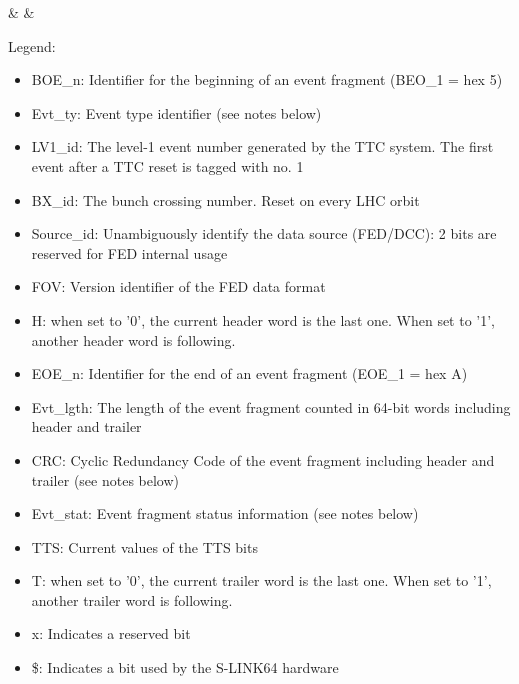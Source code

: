 \begin{landscape}
\begin{table}[htb]
  \caption{Example of a table for a 64-bit format}\label{tab:test3}
    \begin{bittabular}{64}
      & \bitNumEightByte
      & \bitNumEightByte
    \end{bittabular}
\end{table}


Legend: 
\begin{itemize}
\item BOE\_n: Identifier for the beginning of an event fragment (BEO\_1 = hex 5)
\item Evt\_ty: Event type identifier (see notes below)
\item LV1\_id: The level-1 event number generated by the TTC system. The first event after a TTC reset is tagged with no. 1
\item BX\_id: The bunch crossing number. Reset on every LHC orbit
\item Source\_id: Unambiguously identify the data source (FED/DCC): 2 bits are reserved for FED internal usage
\item FOV: Version identifier of the FED data format
\item H: when set to '0', the current header word is the last one. When set to '1', another header word is following.
\item EOE\_n: Identifier for the end of an event fragment (EOE\_1 = hex A)
\item Evt\_lgth: The length of the event fragment counted in 64-bit words including header and trailer
\item CRC: Cyclic Redundancy Code of the event fragment including header and trailer (see notes below)
\item Evt\_stat: Event fragment status information (see notes below)
\item TTS: Current values of the TTS bits
\item T: when set to '0', the current trailer word is the last one. When set to '1', another trailer word is following.
\item x: Indicates a reserved bit
\item \$: Indicates a bit used by the S-LINK64 hardware
\end{itemize}

\end{landscape}




